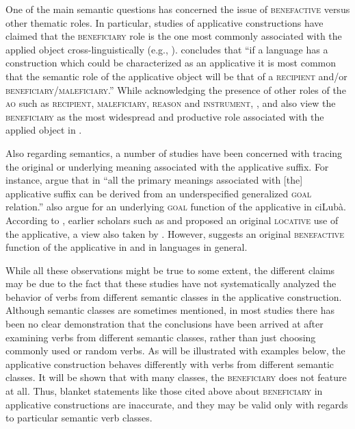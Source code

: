 \documentclass[output=paper]{langsci/langscibook}
\begin{document}
One of the main semantic questions has concerned the issue of \textsc{benefactive} versus other thematic roles. In particular, studies of applicative constructions have claimed that the \textsc{beneficiary} role is the one most commonly associated with the applied object cross-linguistically (e.g., \citealt{Peterson2007,Polinsky2008,KittilaZuniga2010}). \citet[40]{Peterson2007} concludes that “if a language has a construction which could be characterized as an applicative it is most common that the semantic role of the applicative object will be that of a \textsc{recipient} and/or \textsc{beneficiary}/\textsc{maleficiary.”} While acknowledging the presence of other roles of the \textsc{ao} such as \textsc{recipient}, \textsc{maleficiary}, \textsc{reason} and \textsc{instrument}, \citet{Schadeberg2003}, \citet[101]{deKindBostoen2012} and  \citet[1]{MartenKula2014} also view the \textsc{beneficiary} as the most widespread and productive role associated with the applied object in . 

Also regarding semantics, a number of studies have been concerned with tracing the original or underlying meaning associated with the applicative suffix. For instance, \citet[3]{CannMabugu2007} argue that in  “all the primary meanings associated with [the] applicative suffix can be derived from an underspecified generalized \textsc{goal} relation.”   \citet{deKindBostoen2012} also argue for an underlying \textsc{goal} function of the applicative in ciLubà. According to \citet{Trithart1983}, earlier scholars such as \citet{Endemann1876,vanEeden1956} and  \citet{KahlerMeyer1966} proposed an original \textsc{locative} use of the applicative, a view also taken by \citet[74]{Schadeberg2003}. However, \citet[75]{Trithart1983} suggests an original \textsc{benefactive} function of the applicative in  and in  languages in general. 

While all these observations might be true to some extent, the different claims may be due to the fact that these studies have not systematically analyzed the behavior of verbs from different semantic classes in the applicative construction. Although semantic classes are sometimes mentioned, in most studies there has been no clear demonstration that the conclusions have been arrived at after examining verbs from different semantic classes, rather than just choosing commonly used or random verbs. As will be illustrated with  examples below, the applicative construction behaves differently with verbs from different semantic classes. It will be shown that with many classes, the \textsc{beneficiary} does not feature at all. Thus, blanket statements like those cited above about \textsc{beneficiary} in applicative constructions are inaccurate, and they may be valid only with regards to particular semantic verb classes.
\end{document}
